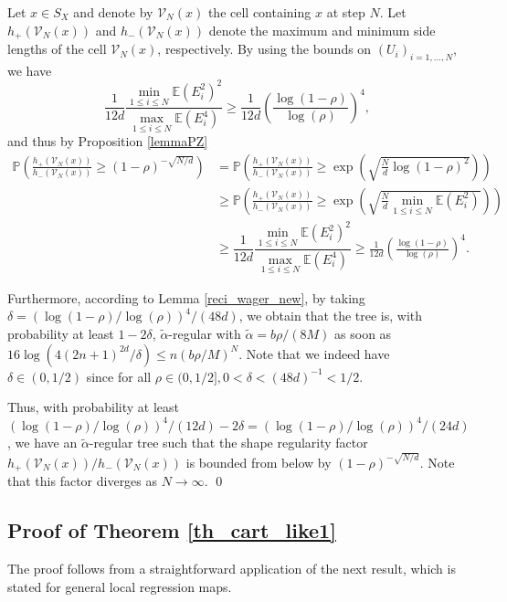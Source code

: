 \documentclass[paper=a4, fontsize=11pt]{scrartcl}
\newcommand{\PP}{\mathbb{P}}
\newcommand{\EE}{\mathbb{E}}
\begin{document}
Let $x \in S_X$ and denote by $\mathcal{V}_N(x)$ the cell containing $x$ at step $N$. Let $h_+(\mathcal{V}_N(x))$ and $h_-(\mathcal{V}_N(x))$ denote the maximum and minimum side lengths of the cell $\mathcal{V}_N(x)$, respectively. By using the bounds on $(U_i)_{i=1,\dots,N}$, we have $$ \dfrac{1}{12d} \dfrac{\min_{1 \leq i \leq N} \EE(E_i^2)^2}{\max_{1 \leq i \leq N} \mathbb{E}(E_i^4)} \geq \frac{1}{12d} \left( \frac{\log(1-\rho)}{\log(\rho)} \right)^4,$$ and thus by Proposition \ref{lemmaPZ} 
    \begin{align*}
    \PP\left(\frac{h_+(\mathcal V _ N (x) )}{h_-(\mathcal V_N  (x) )} 
\geq (1-\rho)^{-\sqrt{N/d}} \right) &= 
\PP\left(\frac{h_+(\mathcal V _ N (x) )}{h_-(\mathcal V_N  (x) )} 
\geq \exp\left(\sqrt{\frac{N}{d} {\log(1-\rho)^2}}\right)\right) \\ &\geq \PP\left(\frac{h_+(\mathcal V _ N (x) )}{h_-(\mathcal V_N  (x) )} 
\geq \exp\left(\sqrt{\frac{N}{d} \min_{1 \leq i \leq N} \mathbb{E}(E_i^2)}\right)\right) \\ &\geq  \dfrac{1}{12d} \dfrac{\min_{1 \leq i \leq N} \EE(E_i^2)^2}{\max_{1 \leq i \leq N} \mathbb{E}(E_i^4)} \geq \frac{1}{12d} \left( \frac{\log(1-\rho)}{\log(\rho)} \right)^4.    
\end{align*} 

Furthermore, according to Lemma \ref{reci_wager_new}, by taking $\delta = \left( {\log(1-\rho)}/{\log(\rho)} \right)^4 /(48d)$, we obtain that the tree is, with probability at least $1-2\delta$, $\tilde{\alpha}$-regular with $\tilde{\alpha} = {b\rho}/{(8M)}$ as soon as $16\log( 4 (2n+1)^{2d} / \delta) \leq n (b\rho / M ) ^{N} $. Note that we indeed have $\delta \in (0,1/2)$ since for all $\rho \in (0,1/2], 0 < \delta < (48d)^{-1} < 1/2.$

Thus, with probability at least $\left( \log(1-\rho)/\log(\rho) \right)^4 /(12d) - 2\delta = \left( \log(1-\rho)/\log(\rho) \right)^4 /(24d)$, we have an $\tilde{\alpha}$-regular tree such that the shape regularity factor ${h_+(\mathcal V _ N (x) )}/{h_-(\mathcal V_N (x) )}$ is bounded from below by $(1-\rho)^{-\sqrt{N/d}}.$ Note that this factor diverges as $N \to \infty$. \qed



\subsection*{Proof of Theorem \ref{th_cart_like1}}

The proof follows from a straightforward application of the next result, which is stated for general local regression maps. 
\end{document}

